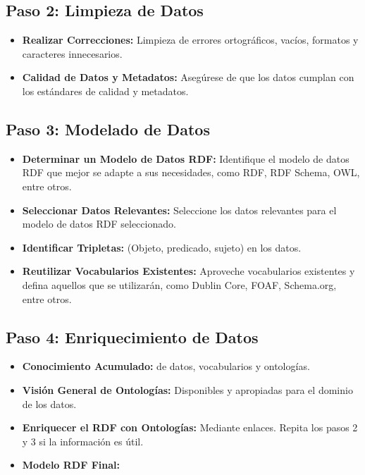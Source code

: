 \documentclass[11pt]{report}
\begin{document}
		\subsection*{Paso 2: Limpieza de Datos}
			\begin{itemize}
			\item \textbf{Realizar Correcciones:} Limpieza de errores ortográficos, vacíos, formatos y caracteres innecesarios.
			
			\item \textbf{Calidad de Datos y Metadatos:} Asegúrese de que los datos cumplan con los estándares de calidad y metadatos.
			\end{itemize}		
		\subsection*{Paso 3: Modelado de Datos}
		\begin{itemize}
			\item \textbf{Determinar un Modelo de Datos RDF:} Identifique el modelo de datos RDF que mejor se adapte a sus necesidades, como RDF, RDF Schema, OWL, entre otros.
			
			\item \textbf{Seleccionar Datos Relevantes:} Seleccione los datos relevantes para el modelo de datos RDF seleccionado.
			
			\item \textbf{Identificar Tripletas:} (Objeto, predicado, sujeto) en los datos.
			
			\item \textbf{Reutilizar Vocabularios Existentes:} Aproveche vocabularios existentes y defina aquellos que se utilizarán, como Dublin Core, FOAF, Schema.org, entre otros.
		\end{itemize}
		
		\subsection*{Paso 4: Enriquecimiento de Datos}
		\begin{itemize}
			\item \textbf{Conocimiento Acumulado:} de datos, vocabularios y ontologías.
			
			\item \textbf{Visión General de Ontologías:} Disponibles y apropiadas para el dominio de los datos.
			
			\item \textbf{Enriquecer el RDF con Ontologías:} Mediante enlaces. Repita los pasos 2 y 3 si la información es útil.
			
			\item \textbf{Modelo RDF Final:}
		\end{itemize}
\end{document}
